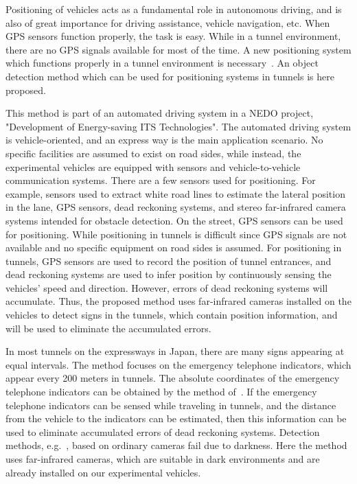 Positioning of vehicles acts as a fundamental role in autonomous driving, and is also of great importance for driving assistance, vehicle navigation, etc. When GPS sensors function properly, the task is easy. While in a tunnel environment, there are no GPS signals available for most of the time. A new positioning system which functions properly in a tunnel environment is necessary~\citep{nig}. An object detection method which can be used for positioning systems in tunnels is here proposed.

This method is part of an automated driving system in a NEDO project, "Development of Energy-saving ITS Technologies".
The automated driving system is vehicle-oriented, and an express way is the main application scenario. No specific facilities are assumed to exist on road sides, while instead, the experimental vehicles are equipped with  sensors and vehicle-to-vehicle communication systems. There are a few sensors used for positioning. For example, sensors used to extract white road lines to estimate the lateral position in the lane, GPS sensors, dead reckoning systems, and stereo far-infrared camera systems intended for obstacle detection. On the street, GPS sensors can be used for positioning. While positioning in tunnels is difficult since GPS signals are not available and no specific equipment on road sides is assumed. For positioning in tunnels, GPS sensors are used to record the position of  tunnel entrances, and dead reckoning systems are used to infer position by continuously sensing the vehicles' speed and direction. However, errors of dead reckoning systems will accumulate. Thus, the proposed method uses far-infrared cameras installed on the vehicles to detect signs in the tunnels, which contain position information, and will be used to eliminate the accumulated errors.

In most tunnels   on the expressways in Japan, there are many signs appearing at equal intervals. The method focuses on the emergency telephone indicators, which appear every 200 meters in tunnels. The absolute coordinates of the emergency telephone indicators can be obtained by the method of~\citep{xue}.  If the emergency telephone indicators can be sensed while traveling in tunnels, and the distance from the vehicle to the indicators can be estimated,  then this information  can be used to eliminate accumulated errors of dead reckoning systems.
Detection methods, e.g.~\citep{ac23}, based on ordinary cameras fail due to darkness. Here the method uses far-infrared cameras,  which are suitable in dark environments and are already installed on our experimental vehicles. 

